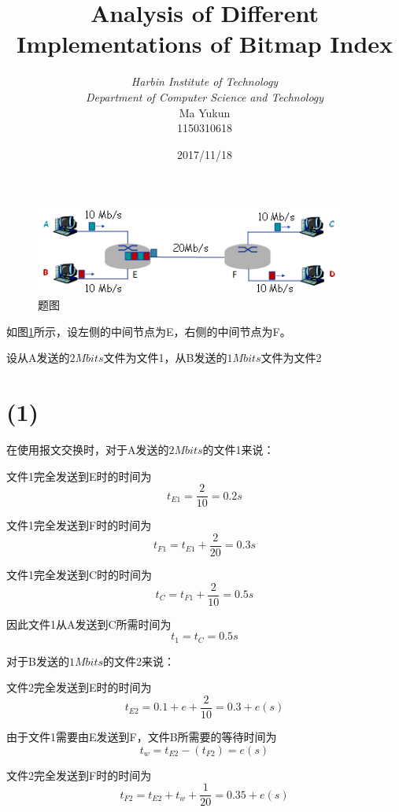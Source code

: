 \documentclass[12pt, a4paper]{article}
\begin{document}
\title{{\bf\Huge Analysis of Different Implementations of Bitmap Index}}
\author{\emph{Harbin Institute of Technology}\\\emph{Department of Computer Science and Technology}\\Ma Yukun\\1150310618}

\date{2017/11/18}

\nocite{*}


\begin{figure}[H]
  \centering
  \includegraphics[width=4in]{figures/img.png}
  \caption{题图}\label{fig:img}
\end{figure}

如图\ref{fig:img}所示，设左侧的中间节点为E，右侧的中间节点为F。

设从A发送的$2Mbits$文件为文件1，从B发送的$1Mbits$文件为文件2

\section{(1)}

在使用报文交换时，对于A发送的$2Mbits$的文件1来说：

文件1完全发送到E时的时间为$$t_{E1}=\frac{2}{10}=0.2s$$

文件1完全发送到F时的时间为$$t_{F1}=t_{E1}+\frac{2}{20}=0.3s$$

文件1完全发送到C时的时间为$$t_{C}=t_{F1}+\frac{2}{10}=0.5s$$

因此文件1从A发送到C所需时间为$$t_{1}=t_{C}=0.5s$$


对于B发送的$1Mbits$的文件2来说：

文件2完全发送到E时的时间为$$t_{E2}=0.1+e+\frac{2}{10}=0.3+e (s)$$

由于文件1需要由E发送到F，文件B所需要的等待时间为$$t_w=t_{E2}-(t_{F2}) = e (s)$$

文件2完全发送到F时的时间为$$t_{F2}=t_{E2}+t_w+\frac{1}{20}=0.35 +e (s)$$
\end{document}
